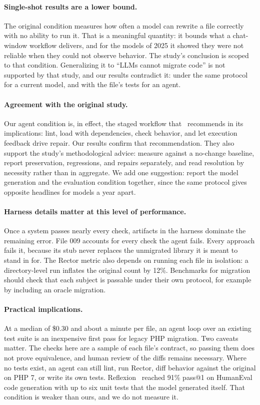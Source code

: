 \documentclass[11pt]{article}
\begin{document}
\paragraph{Single-shot results are a lower bound.}
The original condition measures how often a model can rewrite a file correctly with no ability to run it.
That is a meaningful quantity: it bounds what a chat-window workflow delivers, and for the models of 2025 it showed they were not reliable when they could not observe behavior.
The study's conclusion is scoped to that condition.
Generalizing it to ``LLMs cannot migrate code'' is not supported by that study, and our results contradict it: under the same protocol for a current model, and with the file's tests for an agent.

\paragraph{Agreement with the original study.}
Our agent condition is, in effect, the staged workflow that~\cite{mahmud2026modernization} recommends in its implications: lint, load with dependencies, check behavior, and let execution feedback drive repair.
Our results confirm that recommendation.
They also support the study's methodological advice: measure against a no-change baseline, report preservation, regressions, and repairs separately, and read resolution by necessity rather than in aggregate.
We add one suggestion: report the model generation and the evaluation condition together, since the same protocol gives opposite headlines for models a year apart.

\paragraph{Harness details matter at this level of performance.}
Once a system passes nearly every check, artifacts in the harness dominate the remaining error.
File 009 accounts for every check the agent fails.
Every approach fails it, because its stub never replaces the unmigrated library it is meant to stand in for.
The Rector metric also depends on running each file in isolation: a directory-level run inflates the original count by 12\%.
Benchmarks for migration should check that each subject is passable under their own protocol, for example by including an oracle migration.

\paragraph{Practical implications.}
At a median of \$0.30 and about a minute per file, an agent loop over an existing test suite is an inexpensive first pass for legacy PHP migration.
Two caveats matter.
The checks here are a sample of each file's contract, so passing them does not prove equivalence, and human review of the diffs remains necessary.
Where no tests exist, an agent can still lint, run Rector, diff behavior against the original on PHP 7, or write its own tests.
Reflexion~\cite{shinn2023reflexion} reached 91\% pass@1 on HumanEval code generation with up to six unit tests that the model generated itself.
That condition is weaker than ours, and we do not measure it.
\end{document}
